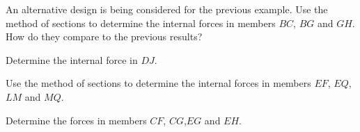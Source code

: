 \documentclass[9pt, xcolor={svgnames, x11names},professionalfonts]{beamer}
\def\scale{1}
\begin{document}
\begin{frame}{}
	\def\scale{0.5125}
	\begin{myexer}{}{}
		\parb\centering
		
		\pars
		An alternative design is being considered for the previous example. 
		Use the method of sections to determine the internal forces in members $BC$, $BG$ and $GH$. How do they compare to the previous results?
		\pars
	\end{myexer}
\end{frame}



\begin{frame}{}
	\def\scale{0.45}
	\begin{myexam}{}{}
		\parb\centering
		
		\parb
		Determine the internal force in $DJ$.
		\pars
	\end{myexam}
\end{frame}

\begin{frame}{}
	\def\scale{0.575}
	
	\begin{myexam}{}{}
		\vspace{-1em}
		\mini[0.5]{
			\parb\centering
					
		}
		\hfill
	\end{myexam}

\end{frame}



\begin{frame}{}
	\def\scale{0.5}
	\begin{myexam}{}{}
		\parb\centering
		
		\pars
		Use the method of sections to determine the internal forces in members $EF$, $EQ$, $LM$ and $MQ$.
		\pars
	\end{myexam}
\end{frame}

\begin{frame}{}
	\def\scale{0.575}
	
	\begin{myexer}{}{}		
			\centering
			
			\parb		
			Determine the forces in members $CF$, $CG$,$EG$ and $EH$.
			\parb		
		
	\end{myexer}

\end{frame}

%


\end{document}
